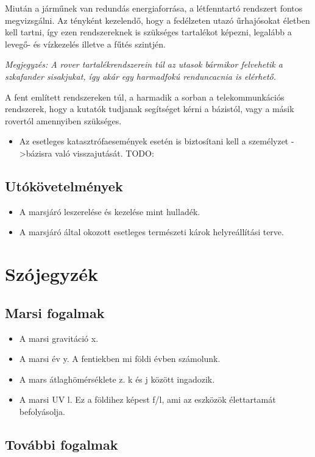 \documentclass[12pt]{report}
\begin{document}
Miután a járműnek van redundás energiaforrása, a létfenntartó rendszert fontos megvizsgálni. Az tényként kezelendő, hogy a fedélzeten utazó űrhajósokat életben kell tartni, így ezen rendszereknek is szükséges tartalékot képezni, legalább a levegő- és vízkezelés illetve a fűtés szintjén. 

\textit{Megjegyzés: A rover tartalékrendszerein túl az utasok bármikor felvehetik a szkafander sisakjukat, így akár egy harmadfokú renduncacnia is elérhető.}

A fent említett rendszereken túl, a harmadik a sorban a telekommunkációs rendszerek, hogy a kutatók tudjanak segítséget kérni a bázistól, vagy a másik rovertól amennyiben szükséges.



\begin{itemize}
  \item Az esetleges katasztrófaesemények esetén is biztosítani kell a személyzet ->bázisra való visszajutását. TODO:
\end{itemize}
\section{Utókövetelmények}
\begin{itemize}
  \item {} A marsjáró leszerelése és kezelése mint hulladék.
  \item {} A marsjáró által okozott esetleges természeti károk helyreállítási terve.
\end{itemize}

\chapter{Szójegyzék}
\section{Marsi fogalmak}
\begin{itemize}
  \item A marsi gravitáció x.
  \item A marsi év y. A fentiekben mi földi évben számolunk.
  \item A mars átlaghömérséklete z. k és j között ingadozik.
  \item A marsi UV l. Ez a földihez képest f/l, ami az eszközök élettartamát befolyásolja.
\end{itemize}

\section{További fogalmak}
\end{document}
